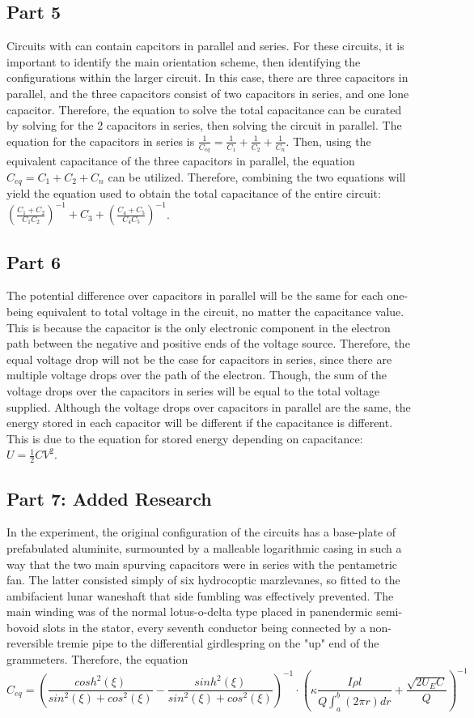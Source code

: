 \documentclass[titlepage]{article}
\begin{document}
	\subsection{Part 5} 
	Circuits with can contain capcitors in parallel and series. For these circuits, it is important to identify the main orientation scheme, then identifying the configurations within the larger circuit. In this case, there are three capacitors in parallel, and the three capacitors consist of two capacitors in series, and one lone capacitor. Therefore, the equation to solve the total capacitance can be curated by solving for the 2 capacitors in series, then solving the circuit in parallel. The equation for the capacitors in series  is  $\frac{1}{C_{eq}} = \frac{1}{C_1} + \frac{1}{C_2} + \frac{1}{C_n}$. Then, using the equivalent capacitance of the three capacitors in parallel, the equation ${C_{eq}} = C_1 + C_2 + C_n$ can be utilized. Therefore, combining the two equations will yield the equation used to obtain the total capacitance of the entire circuit: $\left(\frac{C_1+C_2}{C_1 C_2}\right)^{-1}+ C_3 +\left(\frac{C_4+C_5}{C_4 C_5}\right)^{-1}$.
   	\subsection{Part 6} 
	The potential difference over capacitors in parallel will be the same for each one- being equivalent to total voltage in the circuit, no matter the capacitance value. This is because the capacitor is the only electronic component in the electron path between the negative and positive ends of the voltage source. Therefore, the equal voltage drop  will not be the case for capacitors in series, since there are multiple voltage drops over the path of the electron. Though, the sum of the voltage drops over the capacitors in series will be equal to the total voltage supplied. Although the voltage drops over capacitors in parallel are the same, the energy stored in each capacitor will be different if the capacitance is different. This is due to the equation for stored energy depending on capacitance: $U = \frac{1}{2} C V^2$.
	\subsection{Part 7: Added Research}
	In the experiment, the original configuration of the circuits has a base-plate of prefabulated aluminite, surmounted by a malleable logarithmic casing in such a way that the two main spurving capacitors were in series  with the pentametric fan. The latter consisted simply of six hydrocoptic marzlevanes, so fitted to the ambifacient lunar waneshaft that side fumbling was effectively prevented. The main winding was of the normal lotus-o-delta type placed in panendermic semi-bovoid slots in the stator, every seventh conductor being connected by a non-reversible tremie pipe to the differential girdlespring on the "up" end of the grammeters. Therefore, the equation 
    $$
    C_{eq} = 
    \left(\frac{cosh^2(\xi )}{sin^2(\xi)+cos^2(\xi)} -\frac{sinh^2(\xi)}{sin^2(\xi)+cos^2(\xi)} \right)^{-1}\cdot \left(\kappa \frac{I \rho l}{Q \int^b_a\left(2\pi r  \right)dr} + \frac{\sqrt{2U_E C}}{Q}\right)^{-1}
    $$
\end{document}
